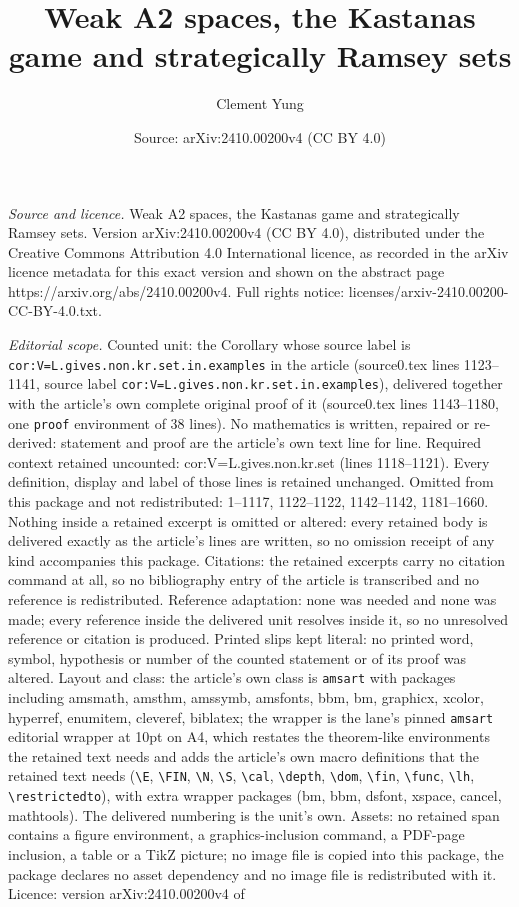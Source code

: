 \documentclass[10pt,a4paper]{amsart}
\title[Weak A2 spaces, the Kastanas game and strategically Ramsey s]{Weak A2 spaces, the Kastanas game and strategically Ramsey sets}
\author{Clement Yung}
\date{Source: arXiv:2410.00200v4 (CC BY 4.0)}
\begin{document}
\maketitle

\noindent\emph{Source and licence.} Weak A2 spaces, the Kastanas game and strategically Ramsey sets. Version arXiv:2410.00200v4 (CC BY 4.0), distributed under the Creative Commons Attribution 4.0 International licence, as recorded in the arXiv licence metadata for this exact version and shown on the abstract page https://arxiv.org/abs/2410.00200v4. Full rights notice: licenses/arxiv-2410.00200-CC-BY-4.0.txt.\par\smallskip

\noindent\textit{Editorial scope.} Counted unit: the Corollary whose source label is \texttt{cor:V=L.gives.non.kr.set.in.examples} in the article (source0.tex lines 1123--1141, source label \texttt{cor:V=L.gives.non.kr.set.in.examples}), delivered together with the article's own complete original proof of it (source0.tex lines 1143--1180, one \texttt{proof} environment of 38 lines). No mathematics is written, repaired or re-derived: statement and proof are the article's own text line for line. Required context retained uncounted: cor:V=L.gives.non.kr.set (lines 1118--1121). Every definition, display and label of those lines is retained unchanged. Omitted from this package and not redistributed: 1--1117, 1122--1122, 1142--1142, 1181--1660. Nothing inside a retained excerpt is omitted or altered: every retained body is delivered exactly as the article's lines are written, so no omission receipt of any kind accompanies this package. Citations: the retained excerpts carry no citation command at all, so no bibliography entry of the article is transcribed and no reference is redistributed. Reference adaptation: none was needed and none was made; every reference inside the delivered unit resolves inside it, so no unresolved reference or citation is produced. Printed slips kept literal: no printed word, symbol, hypothesis or number of the counted statement or of its proof was altered. Layout and class: the article's own class is \texttt{amsart} with packages including amsmath, amsthm, amssymb, amsfonts, bbm, bm, graphicx, xcolor, hyperref, enumitem, cleveref, biblatex; the wrapper is the lane's pinned \texttt{amsart} editorial wrapper at 10pt on A4, which restates the theorem-like environments the retained text needs and adds the article's own macro definitions that the retained text needs (\texttt{\textbackslash E}, \texttt{\textbackslash FIN}, \texttt{\textbackslash N}, \texttt{\textbackslash S}, \texttt{\textbackslash cal}, \texttt{\textbackslash depth}, \texttt{\textbackslash dom}, \texttt{\textbackslash fin}, \texttt{\textbackslash func}, \texttt{\textbackslash lh}, \texttt{\textbackslash restrictedto}), with extra wrapper packages (bm, bbm, dsfont, xspace, cancel, mathtools). The delivered numbering is the unit's own. Assets: no retained span contains a figure environment, a graphics-inclusion command, a PDF-page inclusion, a table or a TikZ picture; no image file is copied into this package, the package declares no asset dependency and no image file is redistributed with it. Licence: version arXiv:2410.00200v4 of 
\end{document}
